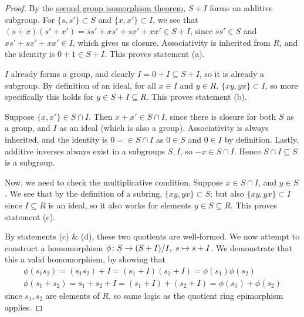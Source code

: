 \begin{proof}
    By the \hyperref[thm:iso-2-group]{second group isomorphism theorem},
    \(S+I\) forms an additive subgroup.
    For \(\{s,s'\} \subset S\) and \(\{x,x'\} \subset I\),
    we see that \((s+x)(s'+x') = ss' + xs' + sx' + xx' \in S+I\),
    since \(ss' \in S\) and \(xs' + sx' + xx' \in I\),
    which gives us closure.
    Associativity is inherited from \(R\),
    and the identity is \(0+1 \in S+I\).
    This proves statement (a).

    \medskip

    \(I\) already forms a group,
    and clearly \(I = 0+I \subseteq S+I\),
    so it is already a subgroup.
    By definition of an ideal,
    for all \(x \in I\) and \(y \in R\), \(\{xy,yx\} \subset I\),
    so more specifically this holds for \(y \in S+I \subseteq R\).
    This proves statement (b).

    \medskip

    Suppose \(\{x,x'\} \in S \cap I\).
    Then \(x+x' \in S \cap I\),
    since there is closure for both \(S\) as a group,
    and \(I\) as an ideal (which is also a group).
    Associativity is always inherited,
    and the identity is \(0 = \in S \cap I\)
    as \(0 \in S\) and \(0 \in I\) by definition.
    Lastly, additive inverses always exist in a subgroups \(S,I\),
    so \(-x \in S \cap I\).
    Hence \(S \cap I \subseteq S\) is a subgroup.

    Now, we need to check the multiplicative condition.
    Suppose \(x \in S \cap I\), and \(y \in S\).
    We see that by the definition of a subring, \(\{xy,yx\} \subset S\);
    but also \(\{xy,yx\} \subset I\) since \(I \subseteq R\) is an ideal,
    so it also works for elements \(y \in S \subseteq R\).
    This proves statement (c).

    \medskip

    By statements (c) \& (d), these two quotients are well-formed.
    We now attempt to construct a homomorphism
    \(\phi\colon S\to(S+I)/I,\;s\mapsto s+I\).
    We demonstrate that this a valid homomorphism,
    by showing that
    \begin{gather*}
        \phi(s_1 s_2) = (s_1 s_2)+I = (s_1 + I)(s_2 + I) = \phi(s_1)\phi(s_2) \\
        \phi(s_1+s_2) = s_1+s_2+I = (s_1+I) + (s_2+I) = \phi(s_1) + \phi(s_2)
    \end{gather*}
    since \(s_1, s_2\) are elements of \(R\),
    so same logic as the quotient ring epimorphism applies.


\end{proof}
